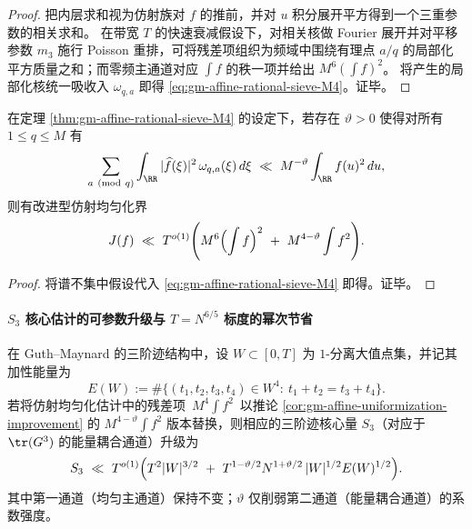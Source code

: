 \begin{proof}
把内层求和视为仿射族对 \(f\) 的推前，并对 \(u\) 积分展开平方得到一个三重参数的相关求和。
在带宽 \(T\) 的快速衰减假设下，对相关核做 Fourier 展开并对平移参数 \(m_3\) 施行 Poisson 重排，可将残差项组织为频域中围绕有理点 \(a/q\) 的局部化平方质量之和；而零频主通道对应 \(\int f\) 的秩一项并给出 \(M^6(\int f)^2\)。
将产生的局部化核统一吸收入 \(\omega_{q,a}\) 即得 \eqref{eq:gm-affine-rational-sieve-M4}。证毕。
\end{proof}

\begin{corollary}[谱不集中 \texorpdfstring{$\Rightarrow$}{=>} 仿射均匀化幂次改进：从 \texorpdfstring{$M^4$}{M4} 到 \texorpdfstring{$M^{4-\vartheta}$}{M4-vtheta}]\label{cor:gm-affine-uniformization-improvement}
在定理 \ref{thm:gm-affine-rational-sieve-M4} 的设定下，若存在 \(\vartheta>0\) 使得对所有 \(1\le q\le M\) 有
\[
\sum_{a\ (\mathrm{mod}\ q)}\int_{\RR} |\widehat f(\xi)|^2\,\omega_{q,a}(\xi)\,d\xi
\ \ll\ 
M^{-\vartheta}\int_{\RR} f(u)^2\,du,
\]
则有改进型仿射均匀化界
\[
J(f)\ \ll\ T^{o(1)}
\Biggl(
M^6\Bigl(\int f\Bigr)^2
\ +\ 
M^{4-\vartheta}\int f^2
\Biggr).
\]
\end{corollary}

\begin{proof}
将谱不集中假设代入 \eqref{eq:gm-affine-rational-sieve-M4} 即得。证毕。
\end{proof}

\paragraph{\texorpdfstring{$S_3$}{S3} 核心估计的可参数升级与 \texorpdfstring{$T=N^{6/5}$}{T=N^{6/5}} 标度的幂次节省}
\begin{proposition}\label{prop:gm-S3-upgrade-vtheta}
在 Guth--Maynard 的三阶迹结构中，设 \(W\subset[0,T]\) 为 \(1\)-分离大值点集，并记其加性能量为
\[
E(W):=\#\{(t_1,t_2,t_3,t_4)\in W^4:\ t_1+t_2=t_3+t_4\}.
\]
若将仿射均匀化估计中的残差项 \(\,M^4\int f^2\,\) 以推论 \ref{cor:gm-affine-uniformization-improvement} 的 \(M^{4-\vartheta}\int f^2\) 版本替换，则相应的三阶迹核心量 \(S_3\)（对应于 \(\tr(G^3)\) 的能量耦合通道）升级为
\[
S_3\ \ll\ T^{o(1)}
\Bigl(
T^2|W|^{3/2}
\ +\ 
T^{1-\vartheta/2}N^{1+\vartheta/2}\,|W|^{1/2}E(W)^{1/2}
\Bigr).
\]
其中第一通道（均匀主通道）保持不变；\(\vartheta\) 仅削弱第二通道（能量耦合通道）的系数强度。
\end{proposition}

